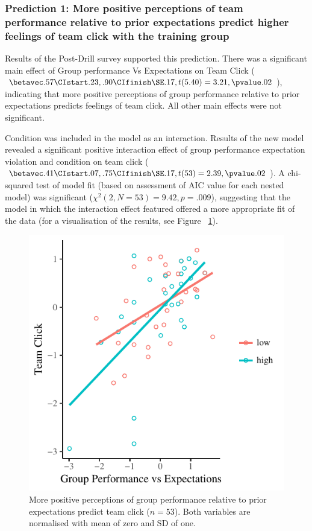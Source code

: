 \subsubsection{Prediction 1: More positive perceptions of team performance relative to prior expectations predict higher feelings of team click with the training group}

Results of the Post-Drill survey supported this prediction. There was a significant main effect of Group performance Vs Expectations on Team Click ($\betavec .57 \CIstart .23, .90 \CIfinish \SE .17, t(5.40) = 3.21, \pvalue .02$), indicating that more positive perceptions of group performance relative to prior expectations predicts feelings of team click.  All other main effects were not significant.

Condition was included in the model as an interaction.  Results of the new model revealed a significant positive interaction effect of group performance expectation violation and condition on team click ($\betavec .41 \CIstart .07, .75 \CIfinish \SE .17, t(53) = 2.39, \pvalue .02 $).  A chi-squared test of model fit (based on assessment of AIC value for each nested model) was significant ($\chi^2 (2, N = 53) = 9.42, p = .009$), suggesting that the model in which the interaction effect featured offered a more appropriate fit of the data (for a visualisation of the results, see Figure ~\ref{fig:teamPerfExpClickScatter}).

\begin{figure}
    \centering
    \includegraphics[width=0.5\linewidth,keepaspectratio] {images/teamPerfExpClickScatter-1}
    \caption{More positive perceptions of group performance relative to prior expectations predict team click ($n = 53$).  Both  variables are normalised with mean of zero and SD of one.}
    \label{fig:teamPerfExpClickScatter}
\end{figure}

